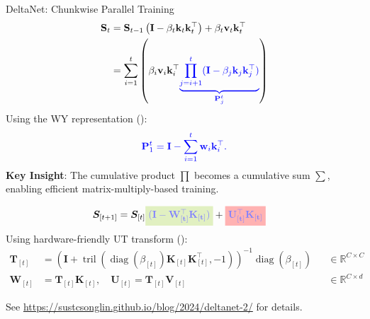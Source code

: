 \begin{frame}{DeltaNet: Chunkwise Parallel Training}
    \begin{align*}
        \mathbf{S}_t &= \mathbf{S}_{t-1} \left(\mathbf{I} - \beta_t \mathbf{k}_t \mathbf{k}_t^\top\right) + \beta_t \mathbf{v}_t \mathbf{k}_t^\top \\
        &= \sum_{i=1}^{t} \left(\beta_i \mathbf{v}_i \mathbf{k}_i^\top {\color{blue}\underbrace{\prod_{j=i+1}^{t} (\mathbf{I} - \beta_j \mathbf{k}_j \mathbf{k}_j^\top)}_{\mathbf{P}_j^t}}\right) 
    \end{align*}
    Using the WY representation (\cite{bischof_wy_1985}):
    \[
    \color{blue}\mathbf{P}_{1}^t = \mathbf{I} - \sum_{i=1}^{t}\mathbf{w}_{i}\mathbf{k}_{i}^{\top}.
    \]
    \color{black}
    {\color{red}\textbf{Key Insight}}: The cumulative product $\prod$ becomes a cumulative sum $\sum$, enabling efficient matrix-multiply-based training.
    \end{frame}

\begin{frame}{}
\vspace{-2mm}
    
    \vspace{-10mm}
    \begin{align*}
        \boldsymbol{S}_{[t+1]} &= \boldsymbol{S}_{[t]}
        {\color{blue!50}\colorbox{yellowgreen!30}{$\mathbf{({\boldsymbol{I}}-\boldsymbol{W}_{[t]}^\top \boldsymbol{K}_{[t]})}$}} + 
        {\color{blue!50}\colorbox{red!30}{$\mathbf{\boldsymbol{U}_{[t]}^\top \boldsymbol{K}_{[t]}}$}}
    \end{align*}
 Using hardware-friendly UT transform (\cite{Joffrain2006AccumulatingHT}):
    \begin{align*}
        \mathbf{T}_{[t]} &= \left(\mathbf{I} + \operatorname{tril}(\operatorname{diag}(\beta_{[t]})\mathbf{K}_{[t]} \mathbf{K}_{[t]}^\intercal,-1)\right)^{-1}\operatorname{diag}\left(\beta_{[t]}\right) &&\in \mathbb{R}^{C \times C} \\  \mathbf{W}_{[t]} &= \mathbf{T}_{[t]} \mathbf{K}_{[t]}, \quad 
        \mathbf{U}_{[t]}=\mathbf{T}_{[t]}\mathbf{V}_{[t]} && \in \mathbb{R}^{C \times d}
    \end{align*}

    \begin{tcolorbox}[colback=yellowgreen!30,colframe=black,boxrule=0.5pt]
        \footnotesize See \url{https://sustcsonglin.github.io/blog/2024/deltanet-2/} for details.
    \end{tcolorbox}
\end{frame}

